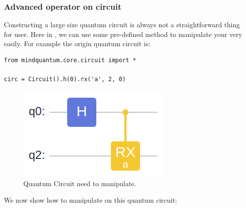 \subsubsection{Advanced operator on circuit}

Constructing a large size quantum circuit is always not a straightforward thing for user. Here in \MindQuantum, we can use some pre-defined method to manipulate your \Circuit very easily. For example the origin quantum circuit is:

\begin{lstlisting}
from mindquantum.core.circuit import *

circ = Circuit().h(0).rx('a', 2, 0)
\end{lstlisting}

\begin{figure}[H]
    \begin{center}
        \includegraphics[width=0.6\linewidth]{images/2_4_ori_circ.png}
    \end{center}
    \caption{Quantum Circuit need to manipulate.}
\end{figure}
We now show how to manipulate on this quantum circuit:


